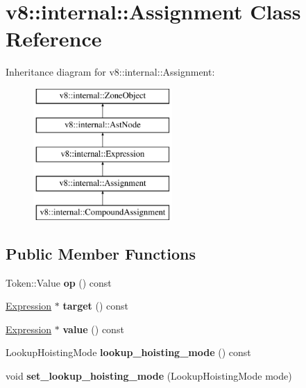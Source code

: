 \hypertarget{classv8_1_1internal_1_1Assignment}{}\section{v8\+:\+:internal\+:\+:Assignment Class Reference}
\label{classv8_1_1internal_1_1Assignment}
Inheritance diagram for v8\+:\+:internal\+:\+:Assignment\+:\begin{figure}[H]
\begin{center}
\leavevmode
\includegraphics[height=5.000000cm]{classv8_1_1internal_1_1Assignment}
\end{center}
\end{figure}
\subsection*{Public Member Functions}
\begin{DoxyCompactItemize}
\item 
\mbox{\label{classv8_1_1internal_1_1Assignment_a1600acf73d5cc53cf7bfc10238dbcc1e}} 
Token\+::\+Value {\bfseries op} () const
\item 
\mbox{\label{classv8_1_1internal_1_1Assignment_a2e102a64e5d5ac8dcc0c09c7b3d8bc7c}} 
\mbox{\hyperlink{classv8_1_1internal_1_1Expression}{Expression}} $\ast$ {\bfseries target} () const
\item 
\mbox{\label{classv8_1_1internal_1_1Assignment_a0ba226d2543f8a17f871a861c7abc8ef}} 
\mbox{\hyperlink{classv8_1_1internal_1_1Expression}{Expression}} $\ast$ {\bfseries value} () const
\item 
\mbox{\label{classv8_1_1internal_1_1Assignment_abef96452b9798c84b68e96f360b56448}} 
Lookup\+Hoisting\+Mode {\bfseries lookup\+\_\+hoisting\+\_\+mode} () const
\item 
\mbox{\label{classv8_1_1internal_1_1Assignment_a1d6e87965e8c6de7a63651c78a79e49d}} 
void {\bfseries set\+\_\+lookup\+\_\+hoisting\+\_\+mode} (Lookup\+Hoisting\+Mode mode)
\end{DoxyCompactItemize}
